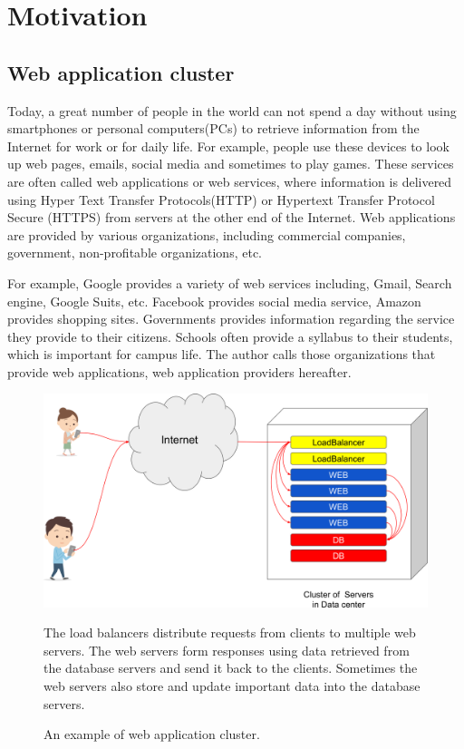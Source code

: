
\section{Motivation}

\subsection{Web application cluster}

Today, a great number of people in the world can not spend a day without using smartphones or personal computers(PCs) to retrieve information from the Internet for work or for daily life.
For example, people use these devices to look up web pages, emails, social media and sometimes to play games.
These services are often called web applications or web services, where information is delivered using Hyper Text Transfer Protocols(HTTP) or Hypertext Transfer Protocol Secure (HTTPS) from servers at the other end of the Internet.
Web applications are provided by various organizations, including commercial companies, government, non-profitable organizations, etc.

For example, Google provides a variety of web services including, Gmail, Search engine, Google Suits, etc.
Facebook provides social media service, Amazon provides shopping sites.
Governments provides information regarding the service they provide to their citizens.
Schools often provide a syllabus to their students, which is important for campus life.
The author calls those organizations that provide web applications, web application providers hereafter.

\begin{figure}[h]
\begin{center}
\includegraphics[width=0.8\columnwidth]{Figs/web_cluster.png}
\end{center}
\caption{
An example of web application cluster.
}
\centering\parbox[c]{0.9\columnwidth}{
The load balancers distribute requests from clients to multiple web servers.
The web servers form responses using data retrieved from the database servers and send it back to the clients.
Sometimes the web servers also store and update important data into the database servers.
}
\label{fig:web_cluster}
\end{figure}

